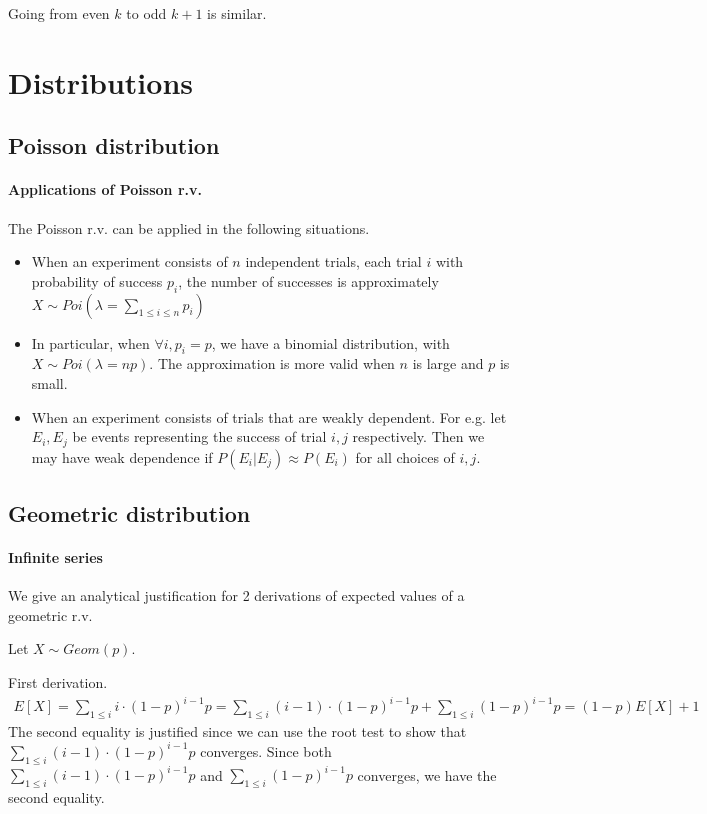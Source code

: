 \documentclass{article}
\begin{document}
Going from even $k$ to odd $k+1$ is similar.

\section{Distributions}
\subsection{Poisson distribution}
\paragraph{Applications of Poisson r.v.} The Poisson r.v. can be applied in the following situations.
\begin{itemize}
	\item When an experiment consists of $n$ independent trials, each trial $i$ with probability of success $p_i$, the number of successes is approximately $X\sim Poi(\lambda = \sum_{1\leq i\leq n} p_i)$
	\item In particular, when $\forall i, p_i = p$, we have a binomial distribution, with $X\sim Poi(\lambda = np)$. The approximation is more valid when $n$ is large and $p$ is small.
	\item When an experiment consists of trials that are weakly dependent. For e.g. let $E_i, E_j$ be events representing the success of trial $i, j$ respectively. Then we may have weak dependence if $P(E_i | E_j)\approx P(E_i)$ for all choices of $i, j$.
\end{itemize}

\subsection{Geometric distribution}
\paragraph{Infinite series} We give an analytical justification for 2 derivations of expected values of a geometric r.v.

Let $X\sim Geom(p)$.

First derivation.
\begin{align*}
	E[X] = \sum_{1\leq i}i\cdot (1-p)^{i-1}p = \sum_{1\leq i}(i-1)\cdot (1-p)^{i-1}p + \sum_{1\leq i}(1-p)^{i-1}p = (1-p)E[X] + 1
\end{align*}
The second equality is justified since we can use the root test to show that $\sum_{1\leq i}(i-1)\cdot (1-p)^{i-1}p$ converges. Since both $\sum_{1\leq i}(i-1)\cdot (1-p)^{i-1}p$ and $\sum_{1\leq i}(1-p)^{i-1}p$ converges, we have the second equality.
\end{document}
